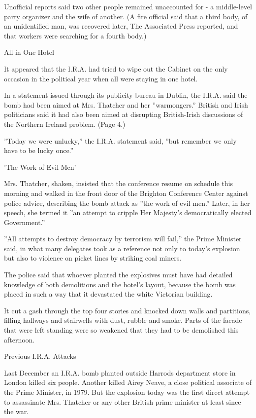 Unofficial reports said two other people remained unaccounted for - a
middle-level party organizer and the wife of another. (A fire official
said that a third body, of an unidentified man, was recovered later, The
Associated Press reported, and that workers were searching for a fourth
body.)

All in One Hotel

It appeared that the I.R.A. had tried to wipe out the Cabinet on the
only occasion in the political year when all were staying in one hotel.

In a statement issued through its publicity bureau in Dublin, the I.R.A.
said the bomb had been aimed at Mrs. Thatcher and her ''warmongers.''
British and Irish politicians said it had also been aimed at disrupting
British-Irish discussions of the Northern Ireland problem. (Page 4.)

''Today we were unlucky,'' the I.R.A. statement said, ''but remember we
only have to be lucky once.''

'The Work of Evil Men'

Mrs. Thatcher, shaken, insisted that the conference resume on schedule
this morning and walked in the front door of the Brighton Conference
Center against police advice, describing the bomb attack as ''the work
of evil men.'' Later, in her speech, she termed it ''an attempt to
cripple Her Majesty's democratically elected Government.''

''All attempts to destroy democracy by terrorism will fail,'' the Prime
Minister said, in what many delegates took as a reference not only to
today's explosion but also to violence on picket lines by striking coal
miners.

The police said that whoever planted the explosives must have had
detailed knowledge of both demolitions and the hotel's layout, because
the bomb was placed in such a way that it devastated the white Victorian
building.

It cut a gash through the top four stories and knocked down walls and
partitions, filling hallways and stairwells with dust, rubble and smoke.
Parts of the facade that were left standing were so weakened that they
had to be demolished this afternoon.

Previous I.R.A. Attacks

Last December an I.R.A. bomb planted outside Harrods department store in
London killed six people. Another killed Airey Neave, a close political
associate of the Prime Minister, in 1979. But the explosion today was
the first direct attempt to assassinate Mrs. Thatcher or any other
British prime minister at least since the war.

